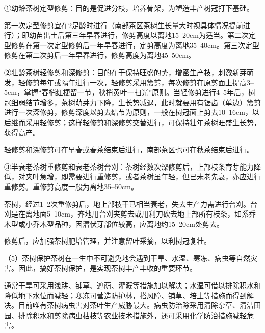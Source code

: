 \documentclass{ctexbook}
\begin{document}
①幼龄茶树定型修剪：目的是促进分枝，培养骨架，为塑造丰产树冠打下基础。

第一次定型修剪宜在2足龄时进行（南部茶区茶树生长量大时视具体情况提前进行）；即幼苗出土后第三年早春进行，修剪高度以离地15--20cm为适当。第二次定型修剪在第一次定型修剪后一年早春进行，定剪高度为离地35--40cm。第三次定型修剪在第二次剪后一年早春进行，修剪高度为离地45--50cm。

②壮龄茶树轻修剪和深修剪：目的在于保持旺盛的势，增密生产枝，刺激新芽萌发，轻修剪每年或隔年进行一次，轻修剪采用篱剪，每次修剪在原剪面上提高3--5cm，掌握“春梢红梗留一节，秋梢黄叶一扫光”原则。当轻修剪进行4--5年后，树冠细弱结节增多，茶树萌芽力下降，生长势减退，此时就要用有锯齿（单边）篱剪进行一次深修剪，修剪深度以剪去结节为原则，一般在树冠面上剪去10--16cm，以后继而采用轻修剪；这样轻修剪和深修剪交替进行，可保持壮年茶树旺盛生长势，获得高产。

轻修剪和深修剪可在早春或春茶结束后进行，南部茶区也可在秋茶结束后进行。

③半衰老茶树重修剪和衰老茶树台刈：茶树经数次深修剪后，上部枝条育芽能力降低，对夹叶急增，即需要进行重修剪，或者茶树虽年轻，但已未老先衰，亦应进行重修剪。重修剪高度一般为离地35--50cm。

茶树，经过1--2次重修剪后，地上部枝干已相当衰老，失去生产力需进行台刈。台刈是在离地面5--10cm，齐地用台刈夹剪去或用利刀砍去地上部所有枝条，如系乔木型或小乔木型品种，因潜伏芽部位较高，应离地约15--20cm处剪去。

修剪后，应加强茶树肥培管理，并注意留叶采摘，以利树冠复壮。

（5）茶树保护茶树在一生中不可避免地会遇到干旱、水湿、寒冻、病虫等自然灾害。因此，搞好茶树保护，是实现茶树丰产丰收的重要环节。

通常干旱可采用浅耕、铺草、遮荫、灌溉等措施加以解决；水湿可借以排除积水和降低地下水位而减轻；寒冻可营造防护林，搭风障、铺草、培土等措施而得到解决。目前唯有茶树病虫害对茶叶生产威胁最大。病虫防治除采用清除杂草、清洁田园、排除积水和剪除病虫枯枝等农业技术措施外，还可采用化学防治措施减轻危害。
\end{document}
